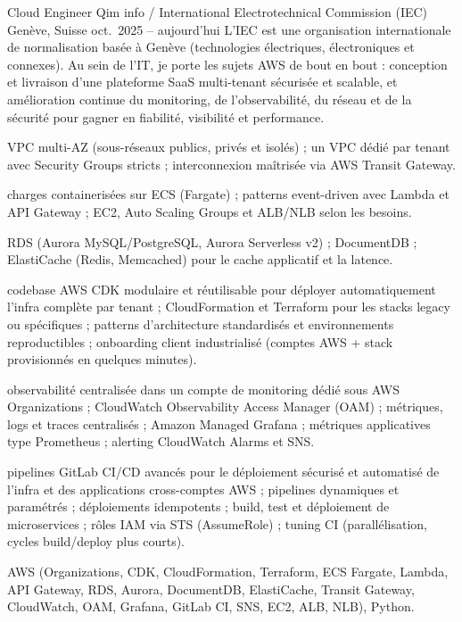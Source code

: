 

\begin{cventries}

  \cventrywithintro
    {Cloud Engineer}
    {Qim info / International Electrotechnical Commission (IEC)}
    {Genève, Suisse}
    {oct.\ 2025 – aujourd'hui}
    {L'IEC est une organisation internationale de normalisation basée à Genève (technologies électriques, électroniques et connexes). Au sein de l'IT, je porte les sujets AWS de bout en bout : conception et livraison d'une plateforme SaaS multi-tenant sécurisée et scalable, et amélioration continue du monitoring, de l'observabilité, du réseau et de la sécurité pour gagner en fiabilité, visibilité et performance.}
    {
      \begin{cvitemsafterintro}
        \item { VPC multi-AZ (sous-réseaux publics, privés et isolés) ; un VPC dédié par tenant avec Security Groups stricts ; interconnexion maîtrisée via AWS Transit Gateway.}
        \item { charges containerisées sur ECS (Fargate) ; patterns event-driven avec Lambda et API Gateway ; EC2, Auto Scaling Groups et ALB/NLB selon les besoins.}
        \item { RDS (Aurora MySQL/PostgreSQL, Aurora Serverless v2) ; DocumentDB ; ElastiCache (Redis, Memcached) pour le cache applicatif et la latence.}
        \item { codebase AWS CDK modulaire et réutilisable pour déployer automatiquement l'infra complète par tenant ; CloudFormation et Terraform pour les stacks legacy ou spécifiques ; patterns d'architecture standardisés et environnements reproductibles ; onboarding client industrialisé (comptes AWS + stack provisionnés en quelques minutes).}
        \item { observabilité centralisée dans un compte de monitoring dédié sous AWS Organizations ; CloudWatch Observability Access Manager (OAM) ; métriques, logs et traces centralisés ; Amazon Managed Grafana ; métriques applicatives type Prometheus ; alerting CloudWatch Alarms et SNS.}
        \item { pipelines GitLab CI/CD avancés pour le déploiement sécurisé et automatisé de l'infra et des applications cross-comptes AWS ; pipelines dynamiques et paramétrés ; déploiements idempotents ; build, test et déploiement de microservices ; rôles IAM via STS (AssumeRole) ; tuning CI (parallélisation, cycles build/deploy plus courts).}
      \end{cvitemsafterintro}
    }
    {AWS (Organizations, CDK, CloudFormation, Terraform, ECS Fargate, Lambda, API Gateway, RDS, Aurora, DocumentDB, ElastiCache, Transit Gateway, CloudWatch, OAM, Grafana, GitLab CI, SNS, EC2, ALB, NLB), Python.}


\end{cventries}
